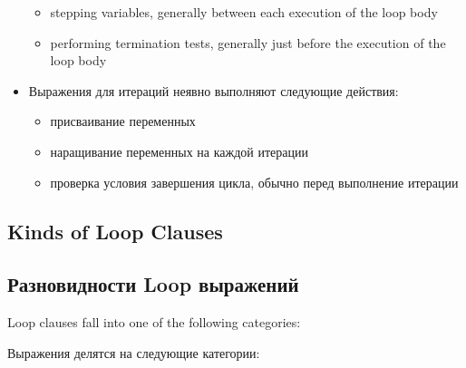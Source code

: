 \begin{itemize}
\begin{itemize}
  \item stepping variables, generally between each execution of the
    loop body

  \item performing termination tests, generally just before the
    execution of the loop body
  \end{itemize}

\item Выражения для итераций неявно выполняют следующие действия:
  \begin{itemize}
  \item присваивание переменных
  \item наращивание переменных на каждой итерации

  \item проверка условия завершения цикла, обычно перед выполнение итерации
  \end{itemize}
  
\end{itemize}

\subsection{Kinds of Loop Clauses}
\label{LOOP-KINDS-SECTION}

\subsection{Разновидности Loop выражений}

Loop clauses fall into one of the following categories:

Выражения делятся на следующие категории:

